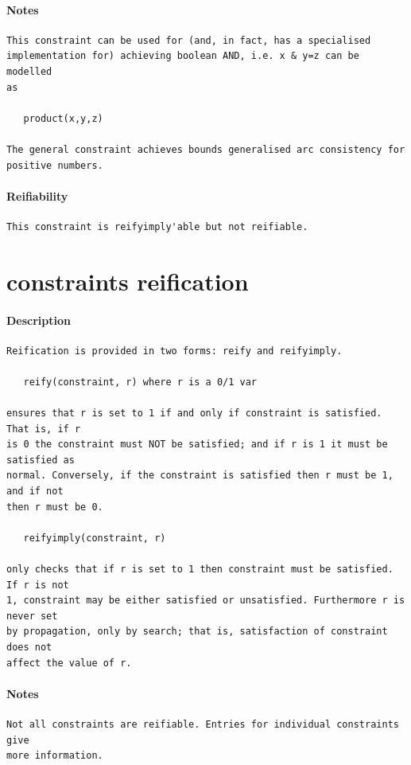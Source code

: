 \documentclass[oneside]{book}
\begin{document}
\paragraph{Notes}
{\footnotesize
\begin{verbatim}
This constraint can be used for (and, in fact, has a specialised
implementation for) achieving boolean AND, i.e. x & y=z can be modelled
as

   product(x,y,z)

The general constraint achieves bounds generalised arc consistency for
positive numbers.
\end{verbatim}
}
\paragraph{Reifiability}
{\footnotesize
\begin{verbatim}
This constraint is reifyimply'able but not reifiable.
\end{verbatim}
}
\section{constraints reification}
\paragraph{Description}
{\footnotesize
\begin{verbatim}
Reification is provided in two forms: reify and reifyimply.

   reify(constraint, r) where r is a 0/1 var

ensures that r is set to 1 if and only if constraint is satisfied. That is, if r
is 0 the constraint must NOT be satisfied; and if r is 1 it must be satisfied as
normal. Conversely, if the constraint is satisfied then r must be 1, and if not
then r must be 0.

   reifyimply(constraint, r)

only checks that if r is set to 1 then constraint must be satisfied. If r is not
1, constraint may be either satisfied or unsatisfied. Furthermore r is never set
by propagation, only by search; that is, satisfaction of constraint does not
affect the value of r.
\end{verbatim}
}
\paragraph{Notes}
{\footnotesize
\begin{verbatim}
Not all constraints are reifiable. Entries for individual constraints give
more information.
\end{verbatim}
}
\end{document}
